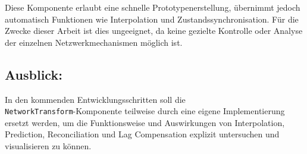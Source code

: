 Diese Komponente erlaubt eine schnelle Prototypenerstellung, übernimmt jedoch automatisch Funktionen wie Interpolation und Zustandssynchronisation. Für die Zwecke dieser Arbeit ist dies ungeeignet, da keine gezielte Kontrolle oder Analyse der einzelnen Netzwerkmechanismen möglich ist. 

\subsection{Ausblick:}
In den kommenden Entwicklungsschritten soll die \\ \texttt{NetworkTransform}-Komponente teilweise durch eine eigene Implementierung ersetzt werden, um die Funktionsweise und Auswirkungen von Interpolation, Prediction, Reconciliation und Lag Compensation explizit untersuchen und visualisieren zu können.
